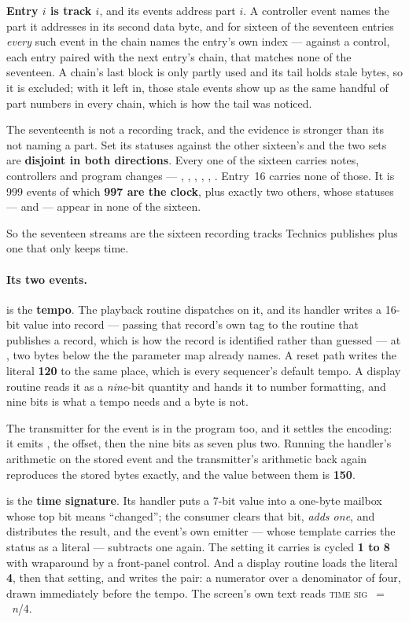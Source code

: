 \textbf{Entry $i$ is track $i$}, and its events address part $i$. A controller event
names the part it addresses in its second data byte, and for sixteen of the seventeen
entries \emph{every} such event in the chain names the entry's own index --- against a
control, each entry paired with the next entry's chain, that matches none of the
seventeen. A chain's last block is only partly used and its tail holds stale bytes, so it
is excluded; with it left in, those stale events show up as the same handful of part
numbers in every chain, which is how the tail was noticed.

The seventeenth is not a recording track, and the evidence is stronger than its not
naming a part. Set its statuses against the other sixteen's and the two sets are
\textbf{disjoint in both directions}. Every one of the sixteen carries notes, controllers
and program changes --- , , , , ,
. Entry~16 carries none of those. It is 999 events of which \textbf{997 are the
clock}, plus exactly two others, whose statuses ---  and  --- appear in
none of the sixteen.

So the seventeen streams are the sixteen recording tracks Technics publishes plus one that
only keeps time.

\paragraph{Its two events.}  is the \textbf{tempo}. The playback routine
dispatches on it, and its handler writes a 16-bit value into record  --- passing
that record's own tag to the routine that publishes a record, which is how the record is
identified rather than guessed --- at , two bytes below the  the
parameter map already names. A reset path writes the literal \textbf{120} to the same
place, which is every sequencer's default tempo. A display routine reads it as a
\emph{nine}-bit quantity and hands it to number formatting, and nine bits is what a tempo
needs and a byte is not.

The transmitter for the event is in the program too, and it settles the encoding: it emits
, the offset, then the nine bits as seven plus two. Running the handler's
arithmetic on the stored event and the transmitter's arithmetic back again reproduces the
stored bytes exactly, and the value between them is \textbf{150}.

 is the \textbf{time signature}. Its handler puts a 7-bit value into a one-byte
mailbox whose top bit means ``changed''; the consumer clears that bit, \emph{adds one}, and
distributes the result, and the event's own emitter --- whose template carries the status
 as a literal --- subtracts one again. The setting it carries is cycled
\textbf{1 to 8} with wraparound by a front-panel control. And a display routine loads the
literal \textbf{4}, then that setting, and writes the pair: a numerator over a denominator
of four, drawn immediately before the tempo. The screen's own text reads
\textsc{time sig}~$=$~\textit{n}/4.

